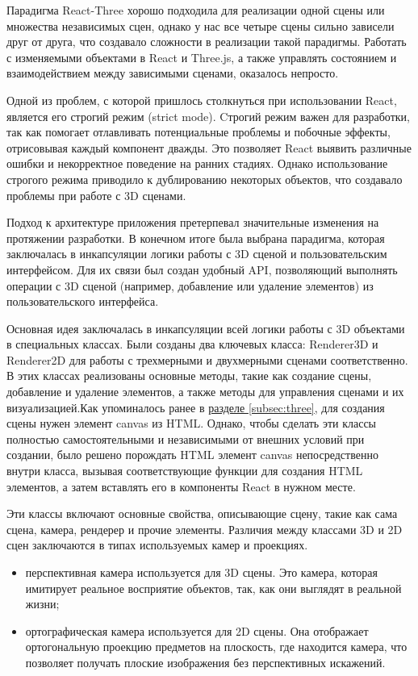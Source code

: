 Парадигма React-Three хорошо подходила для реализации одной сцены или множества независимых сцен, однако у нас все четыре сцены сильно зависели друг от друга, что создавало сложности в реализации такой парадигмы. Работать с изменяемыми объектами в React и Three.js, а также управлять состоянием и взаимодействием между зависимыми сценами, оказалось непросто.

Одной из проблем, с которой пришлось столкнуться при использовании React, является его строгий режим (strict mode). Cтрогий режим важен для разработки, так как помогает отлавливать потенциальные проблемы и побочные эффекты, отрисовывая каждый компонент дважды. Это позволяет React выявить различные ошибки и некорректное поведение на ранних стадиях. Однако использование строгого режима приводило к дублированию некоторых объектов, что создавало проблемы при работе с 3D сценами.

Подход к архитектуре приложения претерпевал значительные изменения на протяжении разработки. В конечном итоге была выбрана парадигма, которая заключалась в инкапсуляции логики работы с 3D сценой и пользовательским интерфейсом. Для их связи был создан удобный API, позволяющий выполнять операции с 3D сценой (например, добавление или удаление элементов) из пользовательского интерфейса.

Основная идея заключалась в инкапсуляции всей логики работы с 3D объектами в специальных классах. Были созданы два ключевых класса: Renderer3D и Renderer2D для работы с трехмерными и двухмерными сценами соответственно. В этих классах реализованы основные методы, такие как создание сцены, добавление и удаление элементов, а также методы для управления сценами и их визуализацией.Как упоминалось ранее в \hyperref[subsec:react]{разделе \ref{subsec:three}}, для создания сцены нужен элемент canvas из HTML. Однако, чтобы сделать эти классы полностью самостоятельными и независимыми от внешних условий при создании, было решено порождать HTML элемент canvas непосредственно внутри класса, вызывая соответствующие функции для создания HTML элементов, а затем вставлять его в компоненты React в нужном месте.

Эти классы включают основные свойства, описывающие сцену, такие как сама сцена, камера, рендерер и прочие элементы. Различия между классами 3D и 2D сцен заключаются в типах используемых камер и проекциях. 

\begin{itemize}
    \item перспективная камера используется для 3D сцены. Это камера, которая имитирует реальное восприятие объектов, так, как они выглядят в реальной жизни;
    \item ортографическая камера используется для 2D сцены. Она отображает ортогональную проекцию предметов на плоскость, где находится камера, что позволяет получать плоские изображения без перспективных искажений.
\end{itemize}

